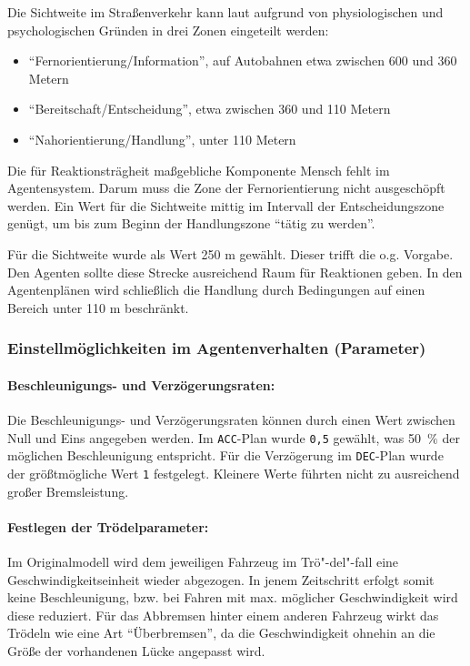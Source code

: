 Die Sichtweite im Straßenverkehr kann laut \cite{sichtweite} aufgrund von physiologischen und psychologischen Gründen in drei Zonen eingeteilt werden:
\begin{itemize}
\itemsep0em
	\item \enquote{Fernorientierung/Information}, auf Autobahnen etwa zwischen 600 und 360 Metern
	\item \enquote{Bereitschaft/Entscheidung}, etwa zwischen 360 und 110 Metern
	\item \enquote{Nahorientierung/Handlung}, unter 110 Metern
\end{itemize}

Die für Reaktionsträgheit maßgebliche Komponente Mensch fehlt im Agentensystem. 
Darum muss die Zone der Fernorientierung nicht ausgeschöpft werden.
Ein Wert für die Sichtweite mittig im Intervall der Entscheidungszone genügt, um bis zum Beginn der Handlungszone \enquote{tätig zu werden}.

Für die Sichtweite wurde als Wert 250 m gewählt.
Dieser trifft die o.g. Vorgabe. 
Den Agenten sollte diese Strecke ausreichend Raum für Reaktionen geben. 
In den Agentenplänen wird schließlich die Handlung durch Bedingungen auf einen Bereich unter 110 m beschränkt.


\subsubsection{Einstellmöglichkeiten im Agentenverhalten (Parameter)}

\paragraph*{Beschleunigungs- und Verzögerungsraten:}
\label{sec:acc-dec-rate}
Die Beschleunigungs- und Verzögerungsraten können durch einen Wert zwischen Null und Eins angegeben werden.
Im \texttt{ACC}-Plan wurde \texttt{0,5} gewählt, was \mbox{50 $\%$} der möglichen Beschleunigung entspricht.
Für die Verzögerung im \texttt{DEC}-Plan wurde der größtmögliche Wert \texttt{1} festgelegt. 
Kleinere Werte führten nicht zu ausreichend großer Bremsleistung.


\paragraph*{Festlegen der Trödelparameter:}
\label{sec:lingersweetspot}
Im Originalmodell wird dem jeweiligen Fahrzeug im Trö"-del"-fall eine Geschwindigkeitseinheit wieder abgezogen. 
In jenem Zeitschritt erfolgt somit keine Beschleunigung, bzw. bei Fahren mit max. möglicher Geschwindigkeit wird diese reduziert. 
Für das Abbremsen hinter einem anderen Fahrzeug wirkt das Trödeln wie eine Art \enquote{Überbremsen}, da die Geschwindigkeit ohnehin an die Größe der vorhandenen Lücke angepasst wird.

